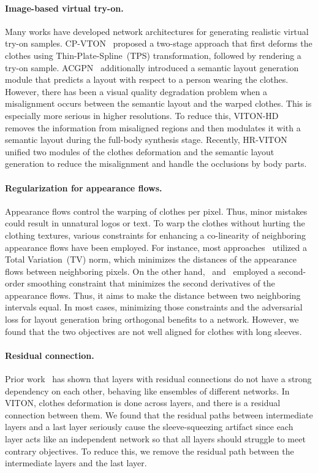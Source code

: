 \documentclass[letterpaper]{article} %
\begin{document}
\paragraph{Image-based virtual try-on.}
Many works have developed network architectures for generating realistic virtual try-on samples.
CP-VTON~\cite{wang2018toward} proposed a two-stage approach that first deforms the clothes using Thin-Plate-Spline~(TPS) transformation, followed by rendering a try-on sample.
ACGPN~\cite{yang2020towards} additionally introduced a semantic layout generation module that predicts a layout with respect to a person wearing the clothes.
However, there has been a visual quality degradation problem when a misalignment occurs between the semantic layout and the warped clothes.
This is especially more serious in higher resolutions.
To reduce this, VITON-HD~\cite{choi2021viton} removes the information from misaligned regions and then modulates it with a semantic layout during the full-body synthesis stage.
Recently, HR-VITON~\cite{lee2022hrviton} unified two modules of the clothes deformation and the semantic layout generation to reduce the misalignment and handle the occlusions by body parts.

\paragraph{Regularization for appearance flows.}
Appearance flows control the warping of clothes per pixel.
Thus, minor mistakes could result in unnatural logos or text.
To warp the clothes without hurting the clothing textures, various constraints for enhancing a co-linearity of neighboring appearance flows have been employed.
For instance, most approaches~\cite{lee2022hrviton, han2019clothflow} utilized a Total Variation~(TV) norm, which minimizes the distances of the appearance flows between neighboring pixels.
On the other hand, \cite{choi2021viton}~and~\cite{ge2021parser} employed a second-order smoothing constraint that minimizes the second derivatives of the appearance flows.
Thus, it aims to make the distance between two neighboring intervals equal.
In most cases, minimizing those constraints and the adversarial loss for layout generation bring orthogonal benefits to a network.
However, we found that the two objectives are not well aligned for clothes with long sleeves.

\paragraph{Residual connection.} Prior work~\cite{veit2016residual} has shown that layers with residual connections do not have a strong dependency on each other, behaving like ensembles of different networks.
In VITON, clothes deformation is done across layers, and there is a residual connection between them.
We found that the residual paths between intermediate layers and a last layer seriously cause the sleeve-squeezing artifact since each layer acts like an independent network so that all layers should struggle to meet contrary objectives.
To reduce this, we remove the residual path between the intermediate layers and the last layer.
\end{document}
